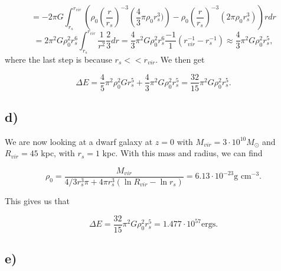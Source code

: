 \documentclass[a4paper,norsk, 10pt]{article}
\begin{document}
\begin{equation}
= -2\pi G \int_{r_s}^{r_{vir}} \left(\rho_0\left(\dfrac{r}{r_s}\right)^{-3}\left( \dfrac{4}{3}\pi \rho_0 r_s^3)\right) -  \rho_0\left(\dfrac{r}{r_s}\right)^{-3}\left(2\pi \rho_0 r_s^3 \right) \right)r dr
\end{equation}
\begin{equation}
= 2\pi^2 G \rho_0^2 r_s^6 \int_{r_s}^{r_{vir}} \frac{1}{r^2} \frac{2}{3} dr = \frac{4}{3}\pi^2 G \rho_0^2 r_s^6 \frac{-1}{1}\left(r_{vir}^{-1} - r_s^{-1}\right) \approx \frac{4}{3}\pi^2 G \rho_0^2 r_s^5,
\end{equation}
where the last step is because $r_s << r_{vir}$. We then get

\begin{equation}
\Delta E = \frac{4}{5}\pi^2 \rho_0^2 G r_s^5 + \frac{4}{3}\pi^2 G \rho_0^2 r_s^5 = \frac{32}{15}\pi^2 G \rho_0^2 r_s^5.
\end{equation}

\subsection{d)}
We are now looking at a dwarf galaxy at $z=0$ with $M_{vir} = 3\cdot10^{10}M_{\odot}$ and $R_{vir} = 45$ kpc, with $r_s = 1$ kpc. With this mass and radius, we can find

\begin{equation}
\rho_0 = \dfrac{M_{vir}}{4/3 r_{s}^3 \pi + 4\pi r_s^3(\ln R_{vir} - \ln r_s)} = 6.13\cdot10^{-23} \text{g cm}^{-3}.
\end{equation}

This gives us that

\begin{equation}
\Delta E = \frac{32}{15}\pi^2 G \rho_0^2 r_s^5 = 1.477\cdot 10^{57} \text{ergs}.
\end{equation}

\subsection{e)}
\end{document}
